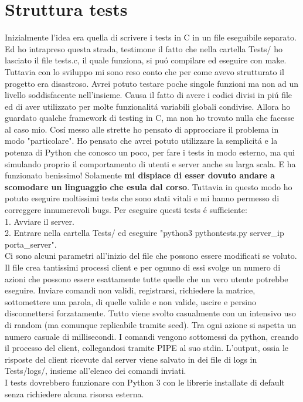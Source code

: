 \chapter{Struttura tests}

Inizialmente l'idea era quella di scrivere i tests in C in un file eseguibile separato. Ed ho intrapreso questa strada, testimone il fatto che nella cartella Tests/ ho lasciato il file tests.c, il quale funziona, si pu\'o compilare ed eseguire con make. Tuttavia con lo sviluppo mi sono reso conto che per come avevo strutturato il progetto era disastroso. Avrei potuto testare poche singole funzioni ma non ad un livello soddisfacente nell'insieme. Causa il fatto di avere i codici divisi in pi\'u file ed di aver utilizzato per molte funzionalit\'a variabili globali condivise. Allora ho guardato qualche framework di testing in C, ma non ho trovato nulla che facesse al caso mio. Cos\'i messo alle strette ho pensato di approcciare il problema in modo "particolare". Ho pensato che avrei potuto utilizzare la semplicit\'a e la potenza di Python che conosco un poco, per fare i tests in modo esterno, ma qui simulando proprio il comportamento di utenti e server anche su larga scala. E ha funzionato benissimo! Solamente \textbf{mi dispiace di esser dovuto andare a scomodare un linguaggio che esula dal corso}. Tuttavia in questo modo ho potuto eseguire moltissimi tests che sono stati vitali e mi hanno permesso di correggere innumerevoli bugs. Per eseguire questi tests \'e sufficiente:
\\
1. Avviare il server.
\\
2. Entrare nella cartella Tests/ ed eseguire "python3 pythontests.py server\_ip porta\_server".
\\
Ci sono alcuni parametri all'inizio del file che possono essere modificati se voluto.
\\
Il file crea tantissimi processi client e per ognuno di essi svolge un numero di azioni che possono essere esattamente tutte quelle che un vero utente potrebbe eseguire. Inviare comandi non validi, registrarsi, richiedere la matrice, sottomettere una parola, di quelle valide e non valide, uscire e persino disconnettersi forzatamente. Tutto viene svolto casualmente con un intensivo uso di random (ma comunque replicabile tramite seed). Tra ogni azione si aspetta un numero casuale di millisecondi. I comandi vengono sottomessi da python, creando il processo del client, collegandosi tramite PIPE al suo stdin. L'output, ossia le risposte del client ricevute dal server viene salvato in dei file di logs in Tests/logs/, insieme all'elenco dei comandi inviati. 
\\
I tests dovrebbero funzionare con Python 3 con le librerie installate di default senza richiedere alcuna risorsa esterna.
